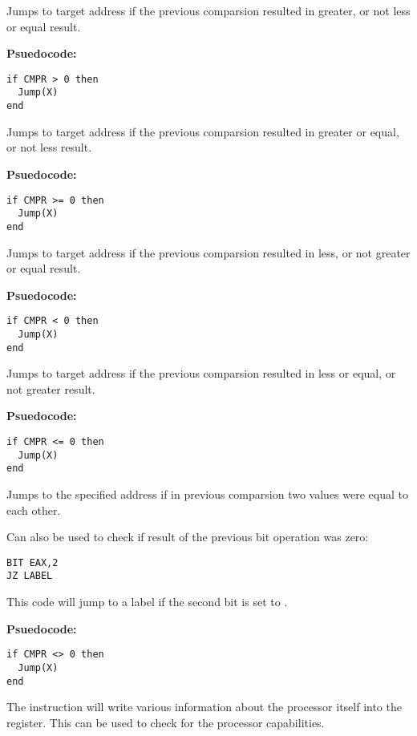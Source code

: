 Jumps to target address if the previous comparsion resulted in greater, or not less or equal result.


\textbf{Psuedocode:}
\begin{verbatim}
if CMPR > 0 then
  Jump(X)
end
\end{verbatim}


Jumps to target address if the previous comparsion resulted in greater or equal, or not less result.


\textbf{Psuedocode:}
\begin{verbatim}
if CMPR >= 0 then
  Jump(X)
end
\end{verbatim}


Jumps to target address if the previous comparsion resulted in less, or not greater or equal result.


\textbf{Psuedocode:}
\begin{verbatim}
if CMPR < 0 then
  Jump(X)
end
\end{verbatim}


Jumps to target address if the previous comparsion resulted in less or equal, or not greater result.


\textbf{Psuedocode:}
\begin{verbatim}
if CMPR <= 0 then
  Jump(X)
end
\end{verbatim}


Jumps to the specified address if in previous comparsion two values were equal to each other.

Can also be used to check if result of the previous bit operation was zero:
\begin{verbatim}
BIT EAX,2
JZ LABEL
\end{verbatim}

This code will jump to a label if the second bit is set to .


\textbf{Psuedocode:}
\begin{verbatim}
if CMPR <> 0 then
  Jump(X)
end
\end{verbatim}


The  instruction will write various information about the processor itself into the  register. This can be used to check for the processor capabilities.

